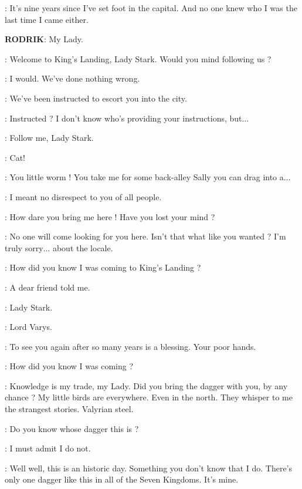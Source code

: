 \CATELYN: It's nine years since I've set foot in the capital. And no one knew who I was the last time I came either. 

\textbf{RODRIK}: My Lady. 

\GUARD: Welcome to King's Landing, Lady Stark. Would you mind following us ? 

\CATELYN: I would. We've done nothing wrong. 

\GUARD: We've been instructed to escort you into the city. 

\CATELYN: Instructed ? I don't know who's providing your instructions, but$\ldots$ 

\GUARD: Follow me, Lady Stark. 


\LITTLEFINGER: Cat!  

\CATELYN: You little worm ! You take me for some back-alley Sally you can drag into a$\ldots$ 

\LITTLEFINGER: I meant no disrespect to you of all people. 

\CATELYN: How dare you bring me here ! Have you lost your mind ? 

\LITTLEFINGER: No one will come looking for you here. Isn't that what like you wanted ? I'm truly sorry$\ldots$ about the locale. 

\CATELYN: How did you know I was coming to King's Landing ? 

\LITTLEFINGER: A dear friend told me. 


\VARYS: Lady Stark. 

\CATELYN: Lord Varys. 

\VARYS: To see you again after so many years is a blessing. Your poor hands. 

\CATELYN: How did you know I was coming ? 

\VARYS: Knowledge is my trade, my Lady. Did you bring the dagger with you, by any chance ? My little birds are everywhere. Even in the north. They whisper to me the strangest stories. Valyrian steel. 

\CATELYN: Do you know whose dagger this is ? 

\VARYS: I must admit I do not. 

\LITTLEFINGER: Well well, this is an historic day. Something you don't know that I do. There's only one dagger like this in all of the Seven Kingdoms. It's mine. 

